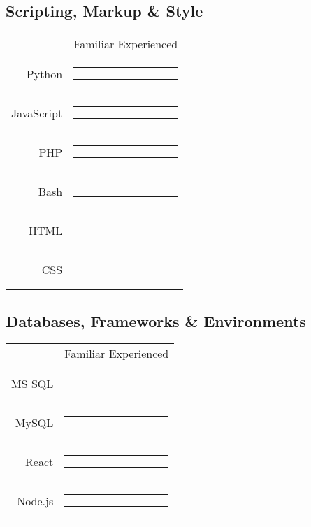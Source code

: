\documentclass[11pt]{article}
\newcommand{\smpad}{\hspace*{.2em}}
\begin{document}
\begin{multicols}{2}
{{\begin{minipage}[t][\paperheight]{.38\textwidth}
\begin{minipage}[t][\paperheight]{.95\textwidth}
\subsection{\large\dotfill Scripting, Markup \& Style\dotfill}
\vspace{-1ex}\hspace{3em}
\begin{tabularx}{\textwidth}{@{}r@{}c@{}}
	\hfill & \footnotesize Familiar \hspace*{1.7em} Experienced\\
	Python \smpad&%
		\color{skillLvl}\rule[.25ex]{9em}{1ex}%
		\color{skillBkgd}\rule[.25ex]{1em}{1ex}\\
	JavaScript \smpad&%
		\color{skillLvl}\rule[.25ex]{8em}{1ex}%
		\color{skillBkgd}\rule[.25ex]{2em}{1ex}\\
	PHP \smpad&%
		\color{skillLvl}\rule[.25ex]{5em}{1ex}%
		\color{skillBkgd}\rule[.25ex]{5em}{1ex}\\
	Bash \smpad&%
		\color{skillLvl}\rule[.25ex]{3em}{1ex}%
		\color{skillBkgd}\rule[.25ex]{7em}{1ex}\\
	HTML \smpad&%
		\color{skillLvl}\rule[.25ex]{9em}{1ex}%
		\color{skillBkgd}\rule[.25ex]{1em}{1ex}\\
	CSS \smpad&%
		\color{skillLvl}\rule[.25ex]{9em}{1ex}%
		\color{skillBkgd}\rule[.25ex]{1em}{1ex}\\
\end{tabularx}
\vspace{-1ex}
\subsection{\large\dotfill Databases, Frameworks \& Environments\dotfill}
\vspace{-1ex}\hspace{4.25em}
\begin{tabularx}{\textwidth}{@{}r@{}c@{}}
	\hfill & \footnotesize Familiar \hspace*{1.7em} Experienced\\
	MS SQL \smpad&%
		\color{skillLvl}\rule[.25ex]{7em}{1ex}%
		\color{skillBkgd}\rule[.25ex]{3em}{1ex}\\
	MySQL \smpad&%
		\color{skillLvl}\rule[.25ex]{7em}{1ex}%
		\color{skillBkgd}\rule[.25ex]{3em}{1ex}\\
	React \smpad&%
		\color{skillLvl}\rule[.25ex]{2em}{1ex}%
		\color{skillBkgd}\rule[.25ex]{8em}{1ex}\\
	Node.js \smpad&%
		\color{skillLvl}\rule[.25ex]{2em}{1ex}%
		\color{skillBkgd}\rule[.25ex]{8em}{1ex}\\
\end{tabularx}
\vspace{-1ex}

\end{minipage}
\end{minipage}}}
\end{multicols}
\end{document}
